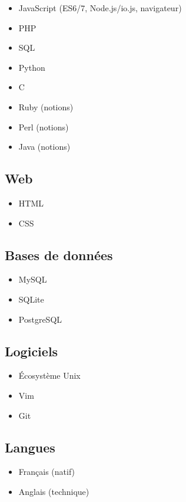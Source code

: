 \documentclass[a4paper]{article}
\begin{document}
\begin{itemize}
  \item JavaScript (ES6/7, Node.js/io.js, navigateur)
  \item PHP
  \item SQL
  \item Python
  \item C
  \item Ruby (notions)
  \item Perl (notions)
  \item Java (notions)
\end{itemize}

\subsection*{Web}

\begin{itemize}
  \item HTML
  \item CSS
\end{itemize}

\subsection*{Bases de données}

\begin{itemize}
  \item MySQL
  \item SQLite
  \item PostgreSQL
\end{itemize}

\subsection*{Logiciels}

\begin{itemize}
  \item Écosystème Unix
  \item Vim
  \item Git
\end{itemize}

\subsection*{Langues}

\begin{itemize}
  \item Français (natif)
  \item Anglais (technique)
\end{itemize}
\end{document}
